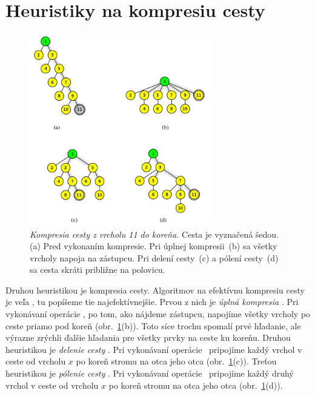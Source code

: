 \section{Heuristiky na kompresiu cesty}

\begin{figure}
\begin{center}
\includegraphics[width=0.7\textwidth]{obrazky/komp.png}
\caption{\emph{Kompresia cesty z vrcholu 11 do koreňa.} 
Cesta je vyznačená šedou. 
(a) Pred vykonaním kompresie. Pri úplnej kompresii~(b) sa všetky vrcholy 
napoja na zástupcu. Pri delení cesty~(c) a pólení cesty~(d) sa cesta skráti 
približne na polovicu.} 
\label{img:komp} 
\end{center}
\end{figure}

Druhou heuristikou je kompresia cesty. Algoritmov na efektívnu kompresiu 
cesty je veľa \citep{paths2}, tu popíšeme tie najefektívnejšie. Prvou z nich 
je \emph{úplná kompresia} \citep{comp1}. Pri vykonávaní operácie \find, po tom, 
ako nájdeme zástupcu, napojíme všetky vrcholy po ceste priamo pod koreň (obr.~\ref{img:komp}(b)).
Toto síce trochu spomalí prvé hľadanie, ale výrazne zrýchli ďalšie hľadania pre
všetky prvky na ceste ku koreňu. Druhou heuristikou je \emph{delenie cesty} \citep{comp2}. Pri vykonávaní 
operácie \find\ pripojíme každý vrchol v ceste od vrcholu $x$ po koreň stromu
na otca jeho otca (obr.~\ref{img:komp}(c)). Treťou heuristikou je \emph{pólenie cesty} \citep{comp2}.
Pri vykonávaní operácie \find\  pripojíme každý druhý vrchol v ceste od vrcholu
$x$ po koreň stromu na otca jeho otca (obr.~\ref{img:komp}(d)).

